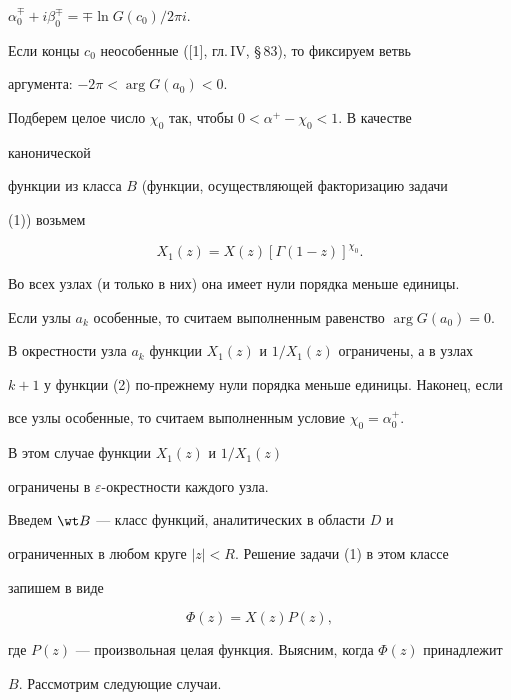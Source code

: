 $\alpha^\mp_0+i\beta^\mp_0=\mp\ln G(c_0)/2\pi i$. 


 


Если концы $c_0$ неособенные ([1], гл.\,IV, \S\,83), то фиксируем ветвь 


аргумента: $-2\pi{<}\arg G(a_0){<}0$. 


Подберем целое число $\chi_0$ так, чтобы $0<\alpha^+-\chi_0<1$. В качестве 


канонической 


функции из класса $B$ (функции, осуществляющей факторизацию задачи 


(1)) возьмем 


\begin{equation} 


X_1(z)=X(z)[\Gamma(1-z)]^{\chi_0}. 


\end{equation} 


Во всех узлах (и только в них) она имеет нули порядка меньше единицы. 


 


Если узлы $a_k$ особенные, то считаем выполненным равенство $\arg G(a_0)=0$. 


В окрестности узла $a_k$ функции $X_1(z)$ и $1/X_1(z)$ ограничены, а в узлах 


$k+1$ у функции (2) по-прежнему нули порядка меньше единицы. Наконец, если 


все узлы особенные, то считаем выполненным условие $\chi_0=\alpha^+_0$. 


В этом случае функции $X_1(z)$ и $1/X_1(z)$ 


ограничены в $\varepsilon$-окрестности каждого узла. 


 


Введем $\wt B$ --- класс функций, аналитических в области $D$ и 


ограниченных в любом круге $|z|<R$. Решение задачи (1) в этом классе 


запишем в виде 


\begin{equation} 


\Phi(z)=X(z)P(z), 


\end{equation} 


где $P(z)$ --- произвольная целая функция. Выясним, когда $\Phi(z)$ принадлежит


$B$. Рассмотрим следующие случаи. 



